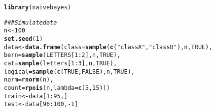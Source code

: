 \documentclass{article}\usepackage[]{graphicx}\usepackage[]{color}
\makeatletter
\newcommand{\hlnum}[1]{\textcolor[rgb]{0.686,0.059,0.569}{#1}}%
\newcommand{\hlstr}[1]{\textcolor[rgb]{0.192,0.494,0.8}{#1}}%
\newcommand{\hlcom}[1]{\textcolor[rgb]{0.678,0.584,0.686}{\textit{#1}}}%
\newcommand{\hlopt}[1]{\textcolor[rgb]{0,0,0}{#1}}%
\newcommand{\hlstd}[1]{\textcolor[rgb]{0.345,0.345,0.345}{#1}}%
\newcommand{\hlkwb}[1]{\textcolor[rgb]{0.69,0.353,0.396}{#1}}%
\newcommand{\hlkwc}[1]{\textcolor[rgb]{0.333,0.667,0.333}{#1}}%
\newcommand{\hlkwd}[1]{\textcolor[rgb]{0.737,0.353,0.396}{\textbf{#1}}}%
\newenvironment{kframe}{%
 \def\at@end@of@kframe{}%
 \ifinner\ifhmode%
  \def\at@end@of@kframe{\end{minipage}}%
  \begin{minipage}{\columnwidth}%
 \fi\fi%
 \def\FrameCommand##1{\hskip\@totalleftmargin \hskip-\fboxsep
 \colorbox{shadecolor}{##1}\hskip-\fboxsep
     \hskip-\linewidth \hskip-\@totalleftmargin \hskip\columnwidth}%
 \MakeFramed {\advance\hsize-\width
   \@totalleftmargin\z@ \linewidth\hsize
   \@setminipage}}%
 {\par\unskip\endMakeFramed%
 \at@end@of@kframe}
\newenvironment{knitrout}{}{} %
\makeatother
\begin{document}
\begin{knitrout}
\color{fgcolor}\begin{kframe}
\begin{alltt}
\hlkwd{library}\hlstd{(naivebayes)}
\end{alltt}


{\ttfamily\noindent\itshape\color{messagecolor}{\#\# naivebayes 0.9.6 loaded}}\begin{alltt}
\hlcom{### Simulate data}
\hlstd{n} \hlkwb{<-} \hlnum{100}
\hlkwd{set.seed}\hlstd{(}\hlnum{1}\hlstd{)}
\hlstd{data} \hlkwb{<-} \hlkwd{data.frame}\hlstd{(}\hlkwc{class} \hlstd{=} \hlkwd{sample}\hlstd{(}\hlkwd{c}\hlstd{(}\hlstr{"classA"}\hlstd{,} \hlstr{"classB"}\hlstd{), n,} \hlnum{TRUE}\hlstd{),}
                   \hlkwc{bern} \hlstd{=} \hlkwd{sample}\hlstd{(LETTERS[}\hlnum{1}\hlopt{:}\hlnum{2}\hlstd{], n,} \hlnum{TRUE}\hlstd{),}
                   \hlkwc{cat}  \hlstd{=} \hlkwd{sample}\hlstd{(letters[}\hlnum{1}\hlopt{:}\hlnum{3}\hlstd{], n,} \hlnum{TRUE}\hlstd{),}
                   \hlkwc{logical} \hlstd{=} \hlkwd{sample}\hlstd{(}\hlkwd{c}\hlstd{(}\hlnum{TRUE}\hlstd{,}\hlnum{FALSE}\hlstd{), n,} \hlnum{TRUE}\hlstd{),}
                   \hlkwc{norm} \hlstd{=} \hlkwd{rnorm}\hlstd{(n),}
                   \hlkwc{count} \hlstd{=} \hlkwd{rpois}\hlstd{(n,} \hlkwc{lambda} \hlstd{=} \hlkwd{c}\hlstd{(}\hlnum{5}\hlstd{,}\hlnum{15}\hlstd{)))}
\hlstd{train} \hlkwb{<-} \hlstd{data[}\hlnum{1}\hlopt{:}\hlnum{95}\hlstd{, ]}
\hlstd{test} \hlkwb{<-} \hlstd{data[}\hlnum{96}\hlopt{:}\hlnum{100}\hlstd{,} \hlopt{-}\hlnum{1}\hlstd{]}



\end{alltt}
\end{kframe}
\end{knitrout}
\end{document}
